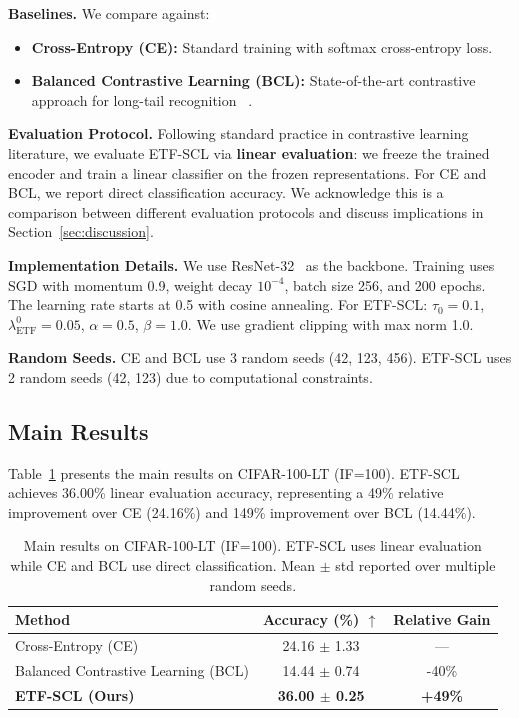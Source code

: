\documentclass{article}
\begin{document}
\textbf{Baselines.} We compare against:
\begin{itemize}
    \item \textbf{Cross-Entropy (CE):} Standard training with softmax cross-entropy loss.
    \item \textbf{Balanced Contrastive Learning (BCL):} State-of-the-art contrastive approach for long-tail recognition~
\citep{zhu2022balanced}.
\end{itemize}

\textbf{Evaluation Protocol.} Following standard practice in contrastive learning literature, we evaluate ETF-SCL via \textbf{linear evaluation}: we freeze the trained encoder and train a linear classifier on the frozen representations. For CE and BCL, we report direct classification accuracy. We acknowledge this is a comparison between different evaluation protocols and discuss implications in Section~\ref{sec:discussion}.

\textbf{Implementation Details.} We use ResNet-32~
\citep{he2016deep} as the backbone. Training uses SGD with momentum 0.9, weight decay $10^{-4}$, batch size 256, and 200 epochs. The learning rate starts at 0.5 with cosine annealing. For ETF-SCL: $\tau_0 = 0.1$, $\lambda_{\text{ETF}}^0 = 0.05$, $\alpha = 0.5$, $\beta = 1.0$. We use gradient clipping with max norm 1.0.

\textbf{Random Seeds.} CE and BCL use 3 random seeds (42, 123, 456). ETF-SCL uses 2 random seeds (42, 123) due to computational constraints.

\subsection{Main Results}

Table~\ref{tab:main} presents the main results on CIFAR-100-LT (IF=100). ETF-SCL achieves 36.00\% linear evaluation accuracy, representing a 49\% relative improvement over CE (24.16\%) and 149\% improvement over BCL (14.44\%).

\begin{table}[t]
\caption{Main results on CIFAR-100-LT (IF=100). ETF-SCL uses linear evaluation while CE and BCL use direct classification. Mean $\pm$ std reported over multiple random seeds.}
\label{tab:main}
\centering
\begin{tabular}{lcc}
\toprule
Method & Accuracy (\%) $\uparrow$ & Relative Gain \\
\midrule
Cross-Entropy (CE) & 24.16 $\pm$ 1.33 & --- \\
Balanced Contrastive Learning (BCL) & 14.44 $\pm$ 0.74 & -40\% \\
\textbf{ETF-SCL (Ours)} & \textbf{36.00 $\pm$ 0.25} & \textbf{+49\%} \\
\bottomrule
\end{tabular}
\end{table}
\end{document}
